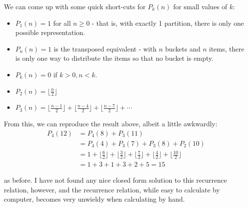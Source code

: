 \documentclass{article}
\begin{document}
We can come up with some quick short-cuts for $P_k(n)$ for small values of $k$:
\begin{itemize}
    \item $P_1(n) = 1$ for all $n \geq 0$ - that is, with exactly 1 partition, there is only one possible representation.
    \item $P_n(n) = 1$ is the transposed equivalent - with $n$ buckets and $n$ items, there is only one way to distribute the items so that no bucket is empty.
    \item $P_k(n) = 0$ if $k > 0, n< k$.
    \item $P_2(n) = \lfloor \frac{n}{2} \rfloor$
    \item $P_3(n) = \lfloor \frac{n-1}{2} \rfloor + \lfloor \frac{n-4}{2} \rfloor + \lfloor \frac{n-7}{2} \rfloor  + \cdots $
\end{itemize}

From this, we can reproduce the result above, albeit a little awkwardly:
\begin{align*}
    P_4(12) &= P_4(8) + P_3(11) \\
    &= P_4(4) + P_3(7) + P_3(8) + P_2(10) \\
    &= 1 + \lfloor \frac{6}{2} \rfloor + \lfloor \frac{3}{2} \rfloor + \lfloor \frac{7}{2} \rfloor + \lfloor \frac{4}{2} \rfloor + \lfloor \frac{10}{2} \rfloor \\
    &= 1 + 3 + 1 + 3 + 2 + 5 = 15    
\end{align*}

as before. I have not found any nice closed form solution to this recurrence relation, however, and the recurrence relation, while easy to calculate by computer, becomes very unwieldy when calculating by hand.
\end{document}
